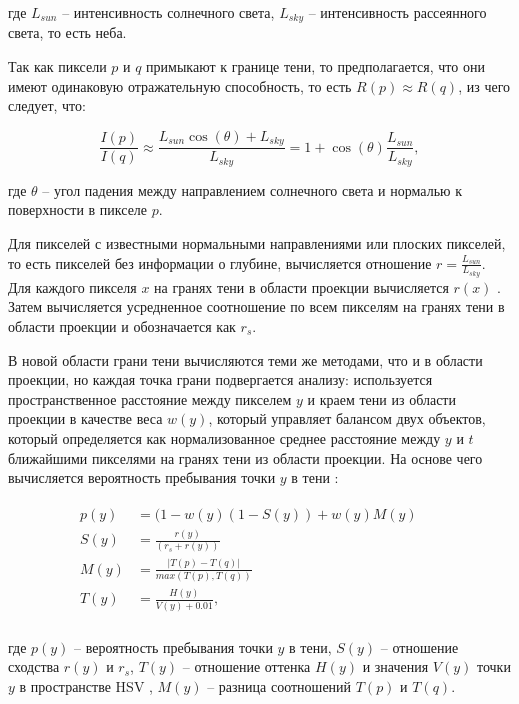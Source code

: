 где $L_{sun}$ -- интенсивность солнечного света, $L_{sky}$ -- интенсивность рассеянного света, то есть неба.

Так как пиксели $p$ и $q$ примыкают к границе тени, то предполагается, что они имеют одинаковую отражательную способность, то есть $R(p) \approx R(q)$, из чего следует, что:

\begin{equation}
	\frac{I(p)}{I(q)} \approx \frac{L_{sun} \cos(\theta) + L_{sky}}{L_{sky}} = 1 + \cos(\theta)\frac{L_{sun}}{L_{sky}},
\end{equation}

где $\theta$ -- угол падения между направлением солнечного света и нормалью к поверхности в пикселе $p$.

Для пикселей с известными нормальными направлениями или плоских пикселей, то есть пикселей без информации о глубине, вычисляется отношение $r = \frac{L_{sun}}{L_{sky}}$. Для каждого пикселя $x$ на гранях тени в области проекции вычисляется $r(x)$ . Затем вычисляется усредненное соотношение по всем пикселям на гранях тени в области проекции и обозначается как $r_s$.

В новой области грани тени вычисляются теми же методами, что и в области проекции, но каждая точка грани подвергается анализу: используется пространственное расстояние между пикселем $y$ и краем тени из области проекции в качестве веса $w(y)$, который управляет балансом двух объектов, который определяется как нормализованное среднее расстояние между $y$ и $t$ ближайшими пикселями на гранях тени из области проекции. На основе чего вычисляется вероятность пребывания точки $y$ в тени \cite{wei2019simulating}:

\begin{equation}
	\begin{aligned}
		\begin{split}
			p(y) &= (1 - w(y)(1 - S(y)) + w(y)M(y) &&\\
			S(y) &= \frac{r(y)}{(r_s + r(y))} &&\\
			M(y) &= \frac{|T(p) - T(q)|}{max(T(p), T(q))} &&\\
			T(y) &= \frac{H(y)}{V(y) + 0.01}, &&\\
		\end{split}
	\end{aligned}
\end{equation}

где $p(y)$ -- вероятность пребывания точки $y$ в тени, $S(y)$ -- отношение сходства $r(y)$ и $r_s$, $T(y)$ -- отношение оттенка $H(y)$ и значения $V(y)$ точки $y$ в пространстве HSV \cite{cheng2001color}, $M(y)$ -- разница соотношений $T(p)$ и $T(q)$.

